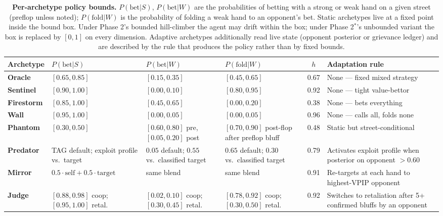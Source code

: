 \documentclass[10pt]{article} %
\newcommand{\arch}[1]{\textbf{#1}}
\begin{document}
\begin{table}[!ht]
\centering
{}
\caption{\textbf{Per-archetype policy bounds.}
$P(\text{bet}|S)$, $P(\text{bet}|W)$ are the probabilities of
betting with a strong or weak hand on a given street (preflop
unless noted); $P(\text{fold}|W)$ is the probability of folding a
weak hand to an opponent's bet. Static archetypes live at a fixed
point inside the bound box. Under Phase 2's bounded hill-climber
the agent may drift within the box; under Phase 2$^{*}$'s
unbounded variant the box is replaced by $[0, 1]$ on every
dimension. Adaptive archetypes additionally read live state
(opponent posterior or grievance ledger) and are described by the
rule that produces the policy rather than by fixed bounds.}
\label{tab:bounds-comprehensive}
\footnotesize
\setlength{\tabcolsep}{4pt}
\begin{tabularx}{\textwidth}{@{}l >{\raggedright\arraybackslash}X >{\raggedright\arraybackslash}X >{\raggedright\arraybackslash}X c >{\raggedright\arraybackslash}X@{}}
\toprule
Archetype & $P(\text{bet}|S)$ & $P(\text{bet}|W)$ & $P(\text{fold}|W)$ & $h$ & Adaptation rule \\
\midrule
\arch{Oracle}    & $[0.65, 0.85]$ & $[0.15, 0.35]$ & $[0.45, 0.65]$ & 0.67 & None --- fixed mixed strategy \\
\arch{Sentinel}  & $[0.90, 1.00]$ & $[0.00, 0.10]$ & $[0.80, 0.95]$ & 0.92 & None --- tight value-bettor \\
\arch{Firestorm} & $[0.85, 1.00]$ & $[0.45, 0.65]$ & $[0.00, 0.20]$ & 0.38 & None --- bets everything \\
\arch{Wall}      & $[0.95, 1.00]$ & $[0.00, 0.05]$ & $[0.00, 0.05]$ & 0.96 & None --- calls all, folds none \\
\arch{Phantom}   & $[0.30, 0.50]$ & $[0.60, 0.80]$ pre, $[0.05, 0.20]$ post & $[0.70, 0.90]$ post-flop after preflop bluff & 0.48 & Static but street-conditional \\
\arch{Predator}  & TAG default; exploit profile vs.\ target & $0.05$ default; $0.55$ vs.\ classified target & $0.65$ default; $0.30$ vs.\ classified target & 0.79 & Activates exploit profile when posterior on opponent $>0.60$ \\
\arch{Mirror}    & $0.5\cdot\text{self}+0.5\cdot\text{target}$ & same blend & same blend & 0.91 & Re-targets at each hand to highest-VPIP opponent \\
\arch{Judge}     & $[0.88, 0.98]$ coop; $[0.95, 1.00]$ retal. & $[0.02, 0.10]$ coop; $[0.30, 0.45]$ retal. & $[0.78, 0.92]$ coop; $[0.30, 0.50]$ retal. & 0.92 & Switches to retaliation after 5+ confirmed bluffs by an opponent \\
\bottomrule
\end{tabularx}
\end{table}
\end{document}
